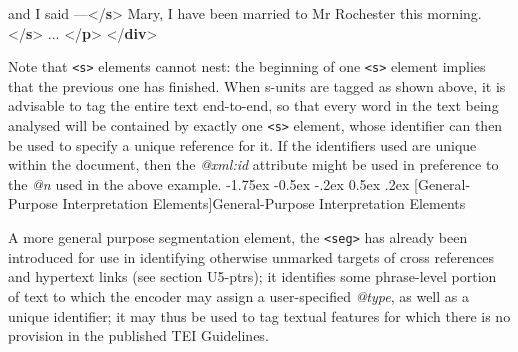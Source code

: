 \documentclass[11pt,twoside]{article}\makeatletter
\makeatletter
\renewcommand\section{\@startsection {section}{1}{\z@}%
     {-1.75ex \@plus -0.5ex \@minus -.2ex}%
     {0.5ex \@plus .2ex}%
     {\reset@font\Large\bfseries\sffamily}}
\renewcommand\subsection{\@startsection{subsection}{2}{\z@}%
     {-1.75ex\@plus -0.5ex \@minus- .2ex}%
     {0.5ex \@plus .2ex}%
     {\reset@font\Large\sffamily}}
\def\DivII{\subsection}
\def\DivII{\section}
\makeatother
\begin{document}
\begin{shaded}
\hspace*{6pt}\hspace*{6pt}\hspace*{6pt}\hspace*{6pt} and I said —{</\textbf{s}>}\mbox{}\newline 
{}\mbox{}\newline 
{}\mbox{}\newline 
\hspace*{6pt}\mbox{}\newline 
\hspace*{6pt}\hspace*{6pt}Mary, I have been married to Mr Rochester\mbox{}\newline 
\hspace*{6pt}\hspace*{6pt}\hspace*{6pt}\hspace*{6pt}\hspace*{6pt}\hspace*{6pt} this morning.{</\textbf{s}>}\mbox{}\newline 
\hspace*{6pt} ... {</\textbf{p}>}\mbox{}\newline 
{</\textbf{div}>}\end{shaded}\egroup\par \noindent   Note that  \texttt{<s>} elements cannot nest: the beginning of one \texttt{<s>} element implies that the previous one has finished. When s-units are tagged as shown above, it is advisable to tag the entire text end-to-end, so that every word in the text being analysed will be contained by exactly one \texttt{<s>} element, whose identifier can then be used to specify a unique reference for it. If the identifiers used are unique within the document, then the \textit{@xml:id} attribute might be used in preference to the \textit{@n} used in the above  example.
\DivII[General-Purpose Interpretation Elements]{General-Purpose Interpretation Elements}\par
A more general purpose segmentation element, the \texttt{<seg>} has   already been introduced for use in identifying otherwise unmarked   targets of cross references and hypertext links (see section U5-ptrs); it identifies some phrase-level portion of text   to which the encoder may assign a user-specified \textit{@type}, as   well as a unique identifier; it may thus be used to tag textual   features for which there is no provision in the published TEI   Guidelines.\par
\end{document}
